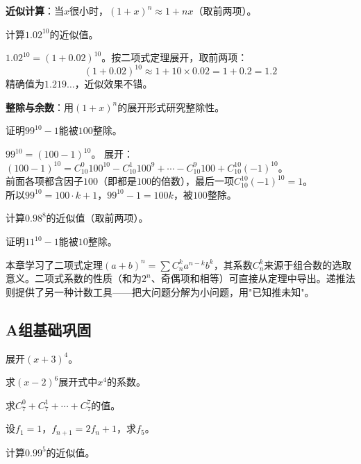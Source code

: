 
\textbf{近似计算}：当$x$很小时，$(1+x)^n \approx 1 + nx$（取前两项）。

\begin{example}
计算$1.02^{10}$的近似值。
\end{example}
\begin{solution}
$1.02^{10} = (1+0.02)^{10}$。按二项式定理展开，取前两项：
\[
(1+0.02)^{10} \approx 1 + 10\times0.02 = 1 + 0.2 = 1.2
\]
精确值为$1.219\dots$，近似效果不错。
\end{solution}

\textbf{整除与余数}：用$(1+x)^n$的展开形式研究整除性。

\begin{example}
证明$99^{10} - 1$能被$100$整除。
\end{example}
\begin{solution}
$99^{10} = (100-1)^{10}$。
展开：$(100-1)^{10} = C_{10}^0 100^{10} - C_{10}^1 100^9 + \cdots - C_{10}^9 100 + C_{10}^{10}(-1)^{10}$。\\
前面各项都含因子$100$（即都是$100$的倍数），最后一项$C_{10}^{10}(-1)^{10} = 1$。\\
所以$99^{10} = 100\cdot k + 1$，$99^{10} - 1 = 100k$，被$100$整除。
\end{solution}

\begin{exercise}
\item 计算$0.98^8$的近似值（取前两项）。
\item 证明$11^{10} - 1$能被$10$整除。
\end{exercise}


本章学习了二项式定理$(a+b)^n = \sum C_n^k a^{n-k}b^k$，其系数$C_n^k$来源于组合数的选取意义。二项式系数的性质（和为$2^n$、奇偶项和相等）可直接从定理中导出。递推法则提供了另一种计数工具——把大问题分解为小问题，用"已知推未知"。


\subsection*{A组\quad 基础巩固}

\begin{exercise}
\item 展开$(x+3)^4$。
\item 求$(x-2)^6$展开式中$x^4$的系数。
\item 求$C_7^0 + C_7^1 + \cdots + C_7^7$的值。
\item 设$f_1=1$，$f_{n+1}=2f_n+1$，求$f_5$。
\item 计算$0.99^5$的近似值。
\end{exercise}

